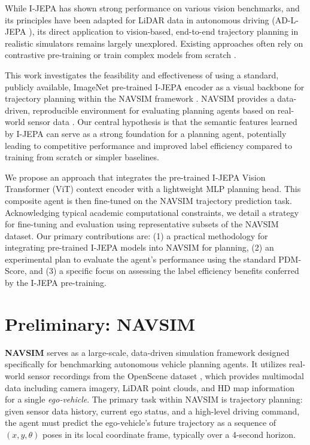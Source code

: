 \documentclass{article}
\begin{document}
While I-JEPA has shown strong performance on various vision benchmarks, and its principles have been adapted for LiDAR data in autonomous driving (AD-L-JEPA \cite{adljepa2025}), its direct application to vision-based, end-to-end trajectory planning in realistic simulators remains largely unexplored. Existing approaches often rely on contrastive pre-training \cite{juneja2024dino} or train complex models from scratch \cite{chitta2023transfuser}.

This work investigates the feasibility and effectiveness of using a standard, publicly available, ImageNet pre-trained I-JEPA encoder as a visual backbone for trajectory planning within the NAVSIM framework \cite{dauner2024navsim}. NAVSIM provides a data-driven, reproducible environment for evaluating planning agents based on real-world sensor data \cite{OpenScene2023}. Our central hypothesis is that the semantic features learned by I-JEPA can serve as a strong foundation for a planning agent, potentially leading to competitive performance and improved label efficiency compared to training from scratch or simpler baselines.

We propose an approach that integrates the pre-trained I-JEPA Vision Transformer (ViT) context encoder with a lightweight MLP planning head. This composite agent is then fine-tuned on the NAVSIM trajectory prediction task. Acknowledging typical academic computational constraints, we detail a strategy for fine-tuning and evaluation using representative subsets of the NAVSIM dataset. Our primary contributions are: (1) a practical methodology for integrating pre-trained I-JEPA models into NAVSIM for planning, (2) an experimental plan to evaluate the agent's performance using the standard PDM-Score, and (3) a specific focus on assessing the label efficiency benefits conferred by the I-JEPA pre-training.

\section{Preliminary: NAVSIM}
\label{sec:navsim}
\textbf{NAVSIM} \cite{dauner2024navsim} serves as a large-scale, data-driven simulation framework designed specifically for benchmarking autonomous vehicle planning agents. It utilizes real-world sensor recordings from the OpenScene dataset \cite{OpenScene2023}, which provides multimodal data including camera imagery, LiDAR point clouds, and HD map information for a single \emph{ego-vehicle}. The primary task within NAVSIM is trajectory planning: given sensor data history, current ego status, and a high-level driving command, the agent must predict the ego-vehicle's future trajectory as a sequence of $(x, y, \theta)$ poses in its local coordinate frame, typically over a 4-second horizon.
\end{document}

